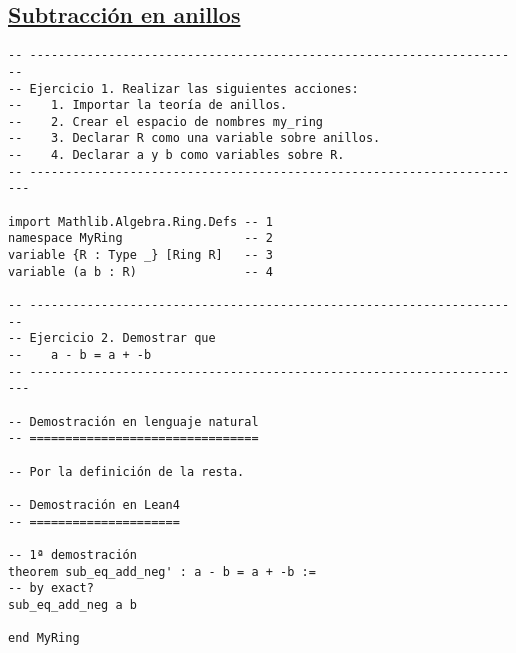 \subsection{\href{./src/Basicos/Subtraccion\_en\_anillos.lean}{Subtracción en anillos}}
\label{sec:org78ff235}
\begin{verbatim}
-- ---------------------------------------------------------------------
-- Ejercicio 1. Realizar las siguientes acciones:
--    1. Importar la teoría de anillos.
--    2. Crear el espacio de nombres my_ring
--    3. Declarar R como una variable sobre anillos.
--    4. Declarar a y b como variables sobre R.
-- ----------------------------------------------------------------------

import Mathlib.Algebra.Ring.Defs -- 1
namespace MyRing                 -- 2
variable {R : Type _} [Ring R]   -- 3
variable (a b : R)               -- 4

-- ---------------------------------------------------------------------
-- Ejercicio 2. Demostrar que
--    a - b = a + -b
-- ----------------------------------------------------------------------

-- Demostración en lenguaje natural
-- ================================

-- Por la definición de la resta.

-- Demostración en Lean4
-- =====================

-- 1ª demostración
theorem sub_eq_add_neg' : a - b = a + -b :=
-- by exact?
sub_eq_add_neg a b

end MyRing
\end{verbatim}

